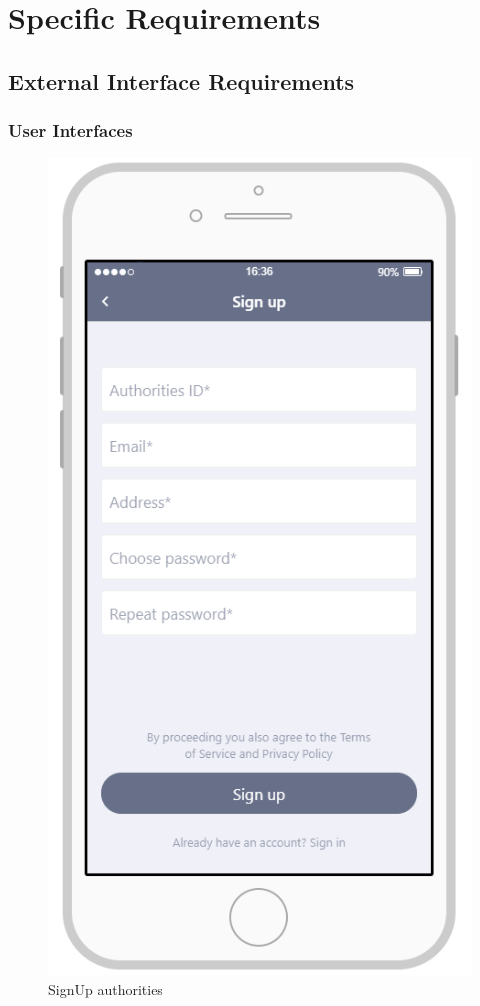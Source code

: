 \documentclass{article}
\begin{document}
\newpage
\section{Specific Requirements}
\subsection{External Interface Requirements}
\subsubsection{User Interfaces}
\begin{figure}[H]
    \centering
    \includegraphics[scale=0.7]{Images/SignUpAuthoritiesApp}
    \caption{SignUp authorities}
\end{figure}
\end{document}
